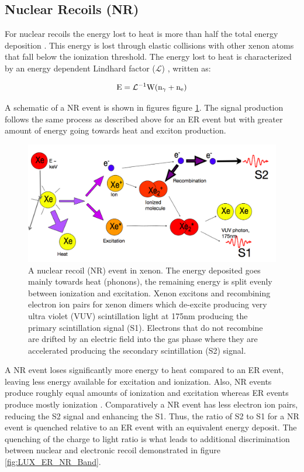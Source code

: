 \subsection{Nuclear Recoils (NR)}
For nuclear recoils the energy lost to heat is more than half the total energy deposition \cite{FanoTheoretical}. This energy is lost through elastic collisions with other xenon atoms that fall below the ionization threshold. The energy lost to heat is characterized by an energy dependent Lindhard factor ($\mathcal{L}$) \cite{Lindhard}, written as: 

\begin{equation}
\rm E=\mathcal{L}^{-1}W (n_\gamma + n_e)
\label{eq:Lindhard}
\end{equation}

A schematic of a NR event is shown in figures figure \ref{fig:TomS_NR}. The signal production follows the same process as described above for an ER event but with greater amount of energy going towards heat and exciton production. 

\renewcommand{\baselinestretch}{1}
\small\normalsize
 \begin{figure}[h!]\centering
\includegraphics[width=130mm]{Chapter_LUX_Det/NR_T_Shutt.png}
\caption{A nuclear recoil (NR) event in xenon. The energy deposited goes mainly towards heat (phonons), the remaining energy is split evenly between ionization and excitation. Xenon excitons and recombining electron ion pairs for xenon dimers which de-excite producing very ultra violet  (VUV) scintillation light at 175nm producing the primary scintillation signal (S1). Electrons that do not recombine are drifted by an electric field into the gas phase where they are accelerated producing the secondary scintillation (S2) signal. }
\label{fig:TomS_NR}
\end{figure}
\renewcommand{\baselinestretch}{2}
\small\normalsize

A NR event loses significantly more energy to heat compared to an ER event, leaving less energy available for excitation and ionization. Also, NR events produce roughly equal amounts of ionization and excitation whereas ER events produce mostly ionization \cite{FanoTheoretical}  \cite{Dahl_Thesis}. Comparatively a NR event has less electron ion pairs, reducing the S2 signal and enhancing the S1. Thus, the ratio of S2 to S1 for a NR event is quenched relative to an ER event with an equivalent energy deposit. The quenching of the charge to light ratio is what leads to additional discrimination between nuclear and electronic recoil demonstrated in figure \ref{fig:LUX_ER_NR_Band}.

